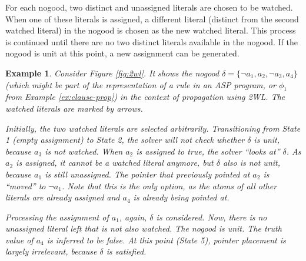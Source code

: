 \documentclass{vutinfth} %
\newtheorem{example}{Example}[section]
\begin{document}
For each nogood, two distinct and unassigned literals are chosen to be watched. When one of these literals is assigned, a different literal (distinct from the second watched literal) in the nogood is chosen as the new watched literal. This process is continued until there are no two distinct literals available in the nogood. If the nogood is unit at this point, a new assignment can be generated.

\begin{example}
Consider Figure \ref{fig:2wl}. It shows the nogood $\delta = \{\neg a_1, a_2, \neg a_3, a_4 \}$ (which might be part of the representation of a rule in an ASP program, or $\phi_1$ from Example \ref{ex:clause-prop}) in the context of propagation using 2WL. The watched literals are marked by arrows.

Initially, the two watched literals are selected arbitrarily. Transitioning from State 1 (empty assignment) to State 2, the solver will not check whether $\delta$ is unit, because $a_3$ is not watched. When $a_2$ is assigned to \emph{true}, the solver \enquote{looks at} $\delta$. As $a_2$ is assigned, it cannot be a watched literal anymore, but $\delta$ also is not unit, because $a_1$ is still unassigned. The pointer that previously pointed at $a_2$ is \enquote{moved} to $\neg a_1$. Note that this is the only option, as the atoms of all other literals are already assigned and $a_4$ is already being pointed at.

Processing the assignment of $a_1$, again, $\delta$ is considered. Now, there is no unassigned literal left that is not also watched. The nogood is unit. The truth value of $a_4$ is inferred to be \emph{false}. At this point (State 5), pointer placement is largely irrelevant, because $\delta$ is satisfied.
\end{example}
\end{document}
